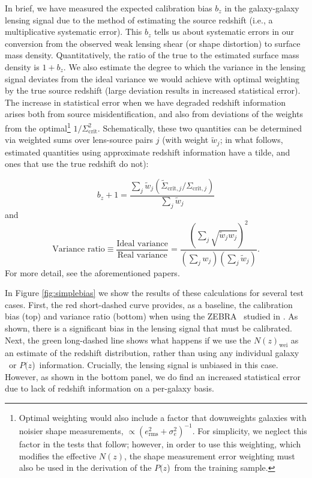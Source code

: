 \documentclass[12pt,preprint]{aastex}
\newcommand{\pofz}{$P(z$)}
\begin{document}
In brief, we have measured the expected calibration bias $b_z$ in the
galaxy-galaxy lensing signal due to the method of estimating the source
redshift (i.e., a multiplicative systematic error).  This $b_z$ tells us about
systematic errors in our conversion from the observed weak lensing shear (or
shape distortion) to surface mass density.  Quantitatively, the ratio of the
true to the estimated surface mass density is $1+b_z$.  We also estimate the
degree to which the variance in the lensing signal deviates from the ideal
variance we would achieve with optimal weighting by the true source redshift
(large deviation results in increased statistical error).  The increase in
statistical error when we have degraded redshift information arises both from
source misidentification, and also from deviations of the weights from the
optimal\footnote{Optimal weighting would also include a factor that downweights
galaxies with noisier shape measurements, $\propto (e_\mathrm{rms}^2 +
\sigma_e^2)^{-1}$.  For simplicity, we neglect this factor in the tests that
follow; however, in order to use this weighting, which modifies the effective
$N(z)$, the shape measurement error weighting must also be used in the
derivation of the \pofz\ from the training sample.} $1/\Sigma_\mathrm{crit}^2$.
Schematically, these two quantities can be determined via weighted sums over
lens-source pairs $j$ (with weight $\tilde{w}_j$; in what follows, estimated
quantities using approximate redshift information have a tilde, and ones that
use the true redshift do not):

\noindent
\begin{equation} \label{eq:lensbias}
b_z + 1 = \frac{\sum_j \tilde{w}_j (\tilde{\Sigma}_{\mathrm{crit},j}
   / \Sigma_{\mathrm{crit},j})}{\sum_j \tilde{w}_j}
\end{equation}
and
\begin{equation} \label{eq:lensweight}
\textrm{Variance ratio}  \equiv \frac{\textrm{Ideal variance}}{\textrm{Real
     variance}} = \frac{(\sum_j \sqrt{\tilde{w}_j w_j})^2}{(\sum_j
     w_j)(\sum_j \tilde{w}_j)}.
\end{equation}
For more detail, see the aforementioned papers.

In Figure \ref{fig:simplebias} we show the results of these calculations for
several test cases.  First, the red short-dashed curve provides, as a baseline,
the calibration bias (top) and variance ratio (bottom) when using the ZEBRA
\photoz\ studied in \citet{Nakajima11}.  As shown, there is a
significant bias in the lensing signal that must be calibrated.
Next, the green long-dashed line shows what happens if we use the
$N(z)_\mathrm{wei}$ as an estimate of the redshift distribution, rather than
using any individual galaxy \photoz\ or \pofz\ information.  Crucially, the
lensing signal is unbiased in this case. However, as shown in the bottom
panel, we do find an increased
statistical error due to lack of redshift information on a per-galaxy basis.
\end{document}
